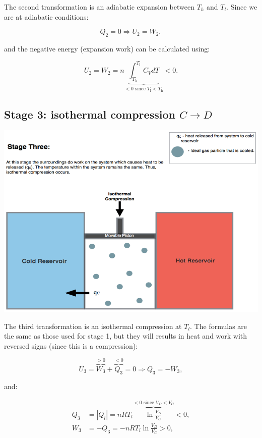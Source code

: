 \documentclass[
  9pt,
]{extbook}
\theoremstyle{definition}
\theoremstyle{definition}
\theoremstyle{definition}
\theoremstyle{remark}
\begin{document}
The second transformation is an adiabatic expansion between \(T_h\) and \(T_l\). Since we are at adiabatic conditions:

\begin{equation}
Q_2 = 0 \Rightarrow U_2 = W_2,
  \label{eq:CCst2}
\end{equation}

and the negative energy (expansion work) can be calculated using:

\begin{equation}
U_2 = W_2 = n \underbrace{\int_{T_h}^{T_l} C_V dT}_{<0 \text{ since } T_\mathrm{l}<T_\mathrm{h}} < 0.
  \label{eq:CCst2b}
\end{equation}

\hypertarget{CCstage3}{%
\subsection{\texorpdfstring{Stage 3: isothermal compression \(C \rightarrow D\)}{Stage 3: isothermal compression C \textbackslash rightarrow D}}\label{CCstage3}}

\begin{center}\includegraphics[width=0.7\linewidth]{./img/OEP_Figures.007c} \end{center}

The third transformation is an isothermal compression at \(T_l\). The formulas are the same as those used for stage 1, but they will results in heat and work with reversed signs (since this is a compression):

\begin{equation}
U_3 = \overbrace{W_3}^{>0} + \overbrace{Q_3}^{<0} = 0 \Rightarrow Q_3 = -W_3,
  \label{eq:CCst3}
\end{equation}

and:

\begin{equation}
\begin{aligned}
 Q_3 & = \left| Q_l \right|  = nRT_l \overbrace{\ln \frac{V_D}{V_C}}^{<0 \text{ since } V_D<V_C} < 0 , \\
 W_3 & = -Q_3 = - nRT_l \ln \frac{V_D}{V_C} > 0,
\end{aligned}
  \label{eq:CCst3b}
\end{equation}
\end{document}

